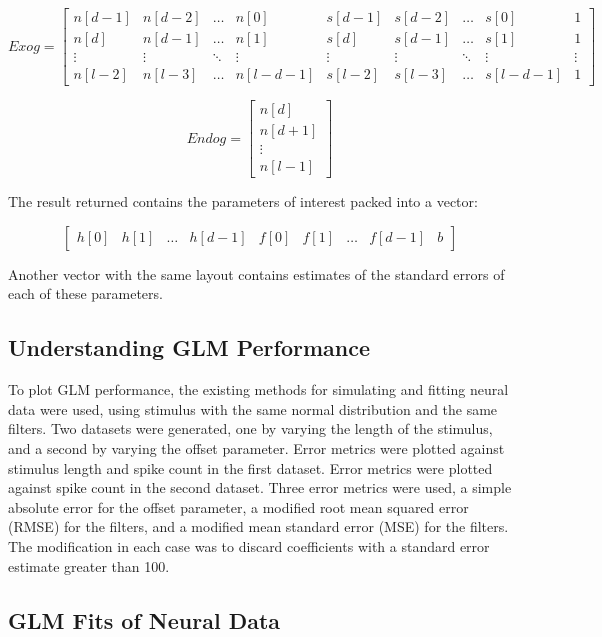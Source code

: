 \documentclass[letterpaper,titlepage,10pt]{article}
\begin{document}
$$Exog=
\begin{bmatrix}
n[d-1] & n[d-2] & \hdots & n[0] & s[d-1] & s[d-2] & \hdots & s[0] & 1\\
n[d] & n[d-1] & \hdots & n[1] & s[d] & s[d-1] & \hdots & s[1] & 1\\
\vdots & \vdots & \ddots & \vdots & \vdots & \vdots & \ddots & \vdots & \vdots \\
n[l-2] & n[l-3] & \hdots & n[l-d-1] & s[l-2] & s[l-3] & \hdots & s[l-d-1] & 1
\end{bmatrix}$$

$$Endog=
\begin{bmatrix}
n[d] \\
n[d+1] \\
\vdots \\
n[l-1]
\end{bmatrix}$$

The result returned contains the parameters of interest packed into a vector:

$$\begin{bmatrix}
h[0] & h[1] & \hdots & h[d-1] & f[0] & f[1] & \hdots & f[d-1] & b
\end{bmatrix}$$

Another vector with the same layout contains estimates of the standard errors of each of these parameters.

\subsection{Understanding GLM Performance}

To plot GLM performance, the existing methods for simulating and fitting neural data were used, using stimulus with
the same normal distribution and the same filters. Two datasets were generated, one by varying the length of the
stimulus, and a second by varying the offset parameter. Error metrics were plotted against stimulus length and spike
count in the first dataset. Error metrics were plotted against spike count in the second dataset. Three error metrics
were used, a simple absolute error for the offset parameter, a modified root mean squared error (RMSE) for the filters,
and a modified mean standard error (MSE) for the filters. The modification in each case was to discard coefficients
with a standard error estimate greater than 100.

\subsection{GLM Fits of Neural Data}
\end{document}
